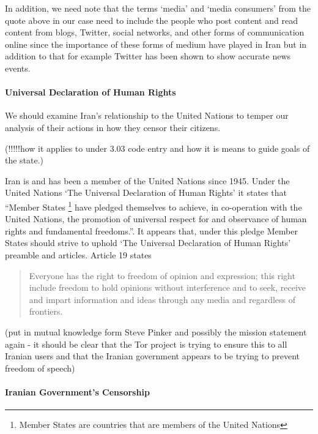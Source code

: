 \documentclass[11pt]{article}
\begin{document}
\begin{multicols}{2}
In addition, we need note that the terms `media' and `media consumers' from the
quote above in our case need to include the people who post content and read
content from blogs, Twitter, social networks, and other forms of communication
online since the importance of these forms of medium have played in Iran but in
addition to that for example Twitter has been shown to show accurate news
events.  \cite{Twitter:BreakingNewsDetection, Twitter:IdentificationLiveEvents,
Twitter:MeasuringInfluence}


\paragraph{Universal Declaration of Human Rights}

We should examine Iran's relationship to the United Nations to temper our
analysis of their actions in how they censor their citizens. 

(!!!!!how it applies to under 3.03 code entry and how it is means to guide goals
of the state.)

Iran is and has been a member of the United Nations since 1945.
\cite{UN:IranBecameMember, UN:IranActiveMember} Under the United Nations `The
Universal Declaration of Human Rights' it states that ``Member States
\footnote{Member States are countries that are members of the United Nations}
have pledged themselves to achieve, in co-operation with the United Nations, the
promotion of universal respect for and observance of human rights and
fundamental freedoms.''\cite{UniversalDeclerationOfHumanRights}. It appears
that, under this pledge Member States should strive to uphold `The Universal
Declaration of Human Rights' preamble and articles. Article 19 states

\begin{quotation} Everyone has the right to freedom of opinion and expression;
  this right include freedom to hold opinions without interference and to seek,
  receive and impart information and ideas through any media and regardless of
  frontiers.  \cite{UniversalDeclerationOfHumanRights}
\end{quotation}

(put in mutual knowledge form Steve Pinker and possibly the mission statement
again - it should be clear that the Tor project is trying to ensure this to all
Iranian users and that the Iranian government appears to be trying to prevent
freedom of speech)


\paragraph{Iranian Government's Censorship}



\end{multicols}
\end{document}
